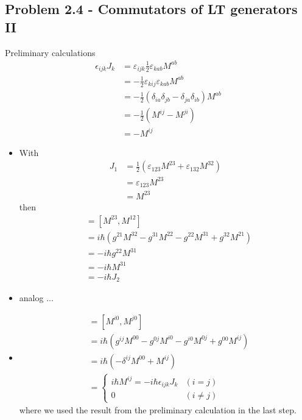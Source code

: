 \documentclass[10pt,a4paper]{book}
\theoremstyle{definition}
\begin{document}
\subsection{Problem 2.4 - Commutators of LT generators II}
Preliminary calculations
\begin{align}
\epsilon_{ijk}J_k
&=\varepsilon_{ijk}\frac{1}{2}\varepsilon_{kab}M^{ab}\\
&=-\frac{1}{2}\varepsilon_{kij}\varepsilon_{kab}M^{ab}\\
&=-\frac{1}{2}\left(\delta_{ia}\delta_{jb}-\delta_{ja}\delta_{ib}\right)M^{ab}\\
&=-\frac{1}{2}\left(M^{ij}-M^{ji}\right)\\
&=-M^{ij}
\end{align}
\begin{itemize}
\item  With
\begin{align}
J_1
&=\frac{1}{2}(\varepsilon_{123}M^{23}+\varepsilon_{132}M^{32})\\
&=\varepsilon_{123}M^{23}\\
&=M^{23}
\end{align}
then
\begin{align}
[J_1,J_3]
&=[M^{23},M^{12}]\\
&=i\hbar\left(g^{21}M^{32}-g^{31}M^{22}-g^{22}M^{31}+g^{32}M^{21}\right)\\
&=-i\hbar g^{22}M^{31}\\
&=-i\hbar M^{31}\\
&=-i\hbar J_2
\end{align}
\item analog ...
\item
\begin{align}
[K^i,K^j]
&=[M^{i0},M^{j0}]\\
&=i\hbar\left(g^{ij}M^{00}-g^{0j}M^{i0}-g^{i0}M^{0j}+g^{00}M^{ij}\right)\\
&=i\hbar\left(-\delta^{ij}M^{00}+M^{ij}\right) \\
&=\left\{
\begin{array}{ll} 
i\hbar M^{ij}=-i\hbar\epsilon_{ijk}J_k 	& (i=j)\\
 0 										& (i\neq j)
\end{array}\right.
\end{align}
where we used the result from the preliminary calculation in the last step.
\end{itemize}
\end{document}
